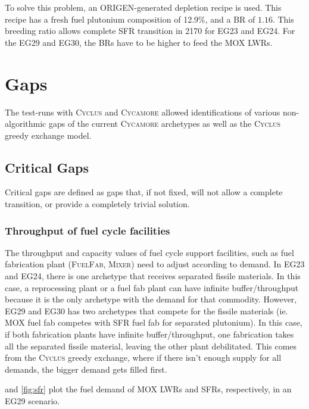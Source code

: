\documentclass{article}
\newcommand{\Cyclus}{\textsc{Cyclus}\xspace}%
\newcommand{\Cycamore}{\textsc{Cycamore}\xspace}%
\begin{document}
To solve this problem, an ORIGEN-generated depletion recipe is used. This recipe
has a fresh fuel plutonium composition of 12.9\%, and a BR of $1.16$. This breeding
ratio allows complete SFR transition in 2170 for EG23 and EG24. For the EG29 and EG30,
the BRs have to be higher to feed the \gls{MOX} \glspl{LWR}. 


\section{Gaps}
The test-runs with \Cyclus and \Cycamore allowed identifications of various non-algorithmic gaps
of the current \Cycamore archetypes as well as the \Cyclus greedy exchange model.

\subsection{Critical Gaps}
Critical gaps are defined as gaps that, if not fixed, will not allow a complete transition,
or provide a completely trivial solution.

\subsubsection{Throughput of fuel cycle facilities}
The throughput and capacity values of fuel cycle support facilities, such as fuel fabrication plant
(\textsc{FuelFab}\xspace, \textsc{Mixer}\xspace) need to adjust according to demand. In EG23 and EG24,
there is one archetype that receives separated fissile materials. In this case, a reprocessing
plant or a fuel fab plant can have infinite buffer/throughput because it is the only
archetype with the demand for that commodity. However, EG29 and EG30 has two archetypes
that compete for the fissile materials (ie. \gls{MOX} fuel fab competes with \gls{SFR} fuel fab for separated plutonium).
In this case, if both fabrication plants have infinite buffer/throughput, one fabrication takes all the
separated fissile material, leaving the other plant debilitated. This comes from the \Cyclus greedy exchange,
where if there isn't enough supply for all demands, the bigger demand gets filled first. 


 and \cref{fig:sfr} plot the fuel demand of \gls{MOX} \glspl{LWR} and \glspl{SFR},
respectively, in an EG29 scenario.
\end{document}
